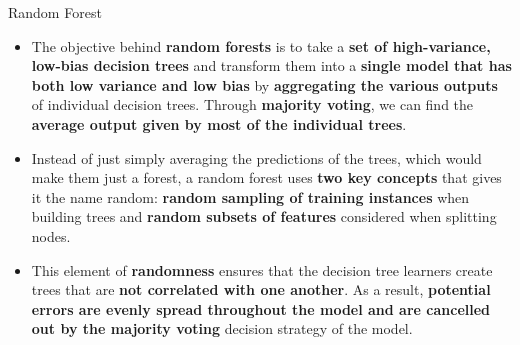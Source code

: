 \documentclass[document.tex]{subfiles}
\begin{document}
    \begin{frame}{Random Forest}
        \begin{itemize}
            \item The objective behind \textbf{random forests} is to take a \textbf{set of high-variance, low-bias decision trees} and transform them into a \textbf{single model that has both low variance and low bias} by \textbf{aggregating the various outputs} of individual decision trees. Through \textbf{majority voting}, we can find the \textbf{average output given by most of the individual trees}.
            \item Instead of just simply averaging the predictions of the trees, which would make them just a forest, a random forest uses \textbf{two key concepts} that gives it the name random: \textbf{random sampling of training instances} when building trees and \textbf{random subsets of features} considered when splitting nodes.
            \item This element of \textbf{randomness} ensures that the decision tree learners create trees that are \textbf{not correlated with one another}. As a result, \textbf{potential errors are evenly spread throughout the model and are cancelled out by the majority voting} decision strategy of the model.
        \end{itemize}
    \end{frame}
    
\end{document}
